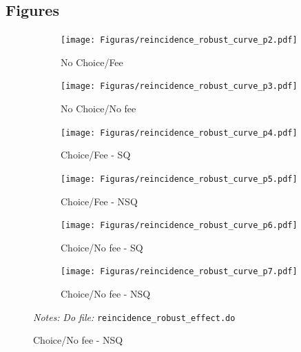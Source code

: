 \documentclass[11pt]{article}
\begin{document}
\subsection{Figures}


\begin{figure}[H]
    \caption{Robustness check effect of arms in reincidence}
    \label{Evolution payment}
    \begin{center}
    \begin{subfigure}{0.49\textwidth}
        \caption{ No Choice/Fee}
        \centering
        \texttt{[image: Figuras/reincidence\_robust\_curve\_p2.pdf]}
    \end{subfigure}
     \begin{subfigure}{0.49\textwidth}
      \caption*{No Choice/No fee}
        \centering
        \texttt{[image: Figuras/reincidence\_robust\_curve\_p3.pdf]}
    \end{subfigure}
    
     \begin{subfigure}{0.49\textwidth}
        \caption{Choice/Fee - SQ}
        \centering
        \texttt{[image: Figuras/reincidence\_robust\_curve\_p4.pdf]}
    \end{subfigure}
     \begin{subfigure}{0.49\textwidth}
      \caption*{Choice/Fee - NSQ}
        \centering
        \texttt{[image: Figuras/reincidence\_robust\_curve\_p5.pdf]}
    \end{subfigure}
    
    \begin{subfigure}{0.49\textwidth}
        \caption{Choice/No fee - SQ}
        \centering
        \texttt{[image: Figuras/reincidence\_robust\_curve\_p6.pdf]}
    \end{subfigure}
     \begin{subfigure}{0.49\textwidth}
      \caption*{Choice/No fee - NSQ}
        \centering
        \texttt{[image: Figuras/reincidence\_robust\_curve\_p7.pdf]}
    \end{subfigure}
    \end{center}
     \footnotesize \textit{Notes: } 
      \footnotesize{ \textit{Do file: }  \texttt{reincidence\_robust\_effect.do}}
\end{figure}


\pagebreak
\end{document}
